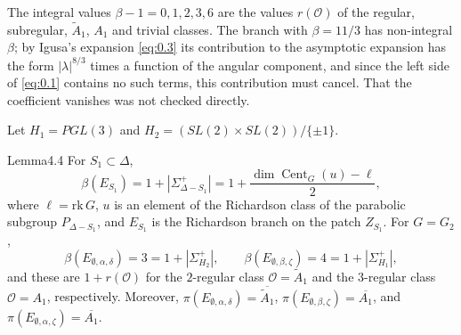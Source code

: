 \documentclass[12pt,letterpaper]{amsart}
\theoremstyle{plain}
\theoremstyle{definition}
\theoremstyle{remark}
\theoremstyle{definition}
\DeclareMathOperator{\Cent}{Cent}
\begin{document}
The integral values $\beta-1=0,1,2,3,6$ are the values $r(\mathcal O)$ of the
regular, subregular, $\tilde A_1$, $A_1$ and trivial classes. The branch with
$\beta=11/3$ has non-integral $\beta$; by Igusa's expansion \eqref{eq:0.3}
its contribution to the asymptotic expansion has the form
$|\lambda|^{8/3}$ times a function of the angular component, and since the
left side of \eqref{eq:0.1} contains no such terms, this contribution must
cancel. That the coefficient vanishes was not checked directly.

Let $H_1=PGL(3)$
and $H_2=(SL(2)\times SL(2))/\{\pm 1\}$.

\begin{res}{Lemma}{4.4}\label{res:4.4}
For $S_1\subset\Delta$,
\[
\beta(E_{S_1})=1+|\Sigma_{\Delta-S_1}^+|=1+\frac{\dim\Cent_G(u)-\ell}{2},
\]
where $\ell=\mathrm{rk}\,G$, $u$ is an element of the Richardson class of the
parabolic subgroup $P_{\Delta-S_1}$, and $E_{S_1}$ is the
Richardson branch on the patch $Z_{S_1}$. For $G=G_2$,
\[
\beta(E_{\emptyset,\alpha,\delta})=3=1+|\Sigma_{H_2}^+|,\qquad
\beta(E_{\emptyset,\beta,\zeta})=4=1+|\Sigma_{H_1}^+|,
\]
and these are $1+r(\mathcal O)$ for the $2$-regular class
$\mathcal O=\tilde A_1$ and the $3$-regular class $\mathcal O=A_1$, respectively.
Moreover, $\pi(E_{\emptyset,\alpha,\delta})=\overline{\tilde A_1}$,
$\pi(E_{\emptyset,\beta,\zeta})=\overline{A_1}$, and
$\pi(E_{\emptyset,\alpha,\zeta})=\overline{A_1}$.
\end{res}
\end{document}
